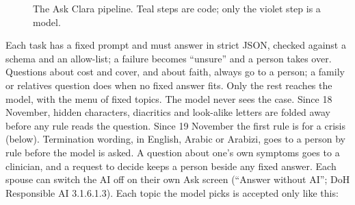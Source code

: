 \documentclass[10.5pt,a4paper]{article}
\begin{document}
\begin{figure}[!htbp]
\centering
{}
\caption{The Ask Clara pipeline. Teal steps are code; only the violet step is a model.}
\end{figure}

Each task has a fixed prompt and must answer in strict JSON, checked against a schema and an allow-list; a failure
becomes ``unsure'' and a person takes over. Questions about cost and cover, and about faith, always go to a person;
a family or relatives question does when no fixed answer fits. Only the rest reaches the model, with the menu of
fixed topics. The model never sees the case. Since 18 November, hidden characters, diacritics and look-alike letters
are folded away before any rule reads the question. Since 19 November the first rule is for a crisis (below). Termination
wording, in English, Arabic or Arabizi, goes to a person by rule before the model is asked. A question about one's own
symptoms goes to a clinician, and a request to decide keeps a person beside any fixed answer. Each spouse can switch the AI off on their own Ask screen (``Answer
without AI''; DoH Responsible AI 3.1.6.1.3). Each topic the model picks is accepted only like this:
\end{document}
